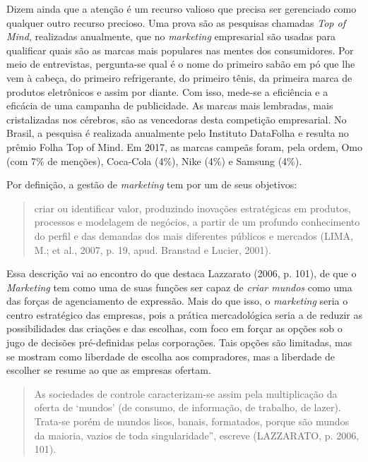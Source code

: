 Dizem ainda que a atenção é um recurso valioso que precisa ser
gerenciado como qualquer outro recurso precioso. Uma prova são as
pesquisas chamadas \emph{Top of Mind}, realizadas anualmente, que no
\emph{marketing} empresarial são usadas para qualificar quais são as
marcas mais populares nas mentes dos consumidores. Por meio de
entrevistas, pergunta-se qual é o nome do primeiro sabão em pó que lhe
vem à cabeça, do primeiro refrigerante, do primeiro tênis, da primeira
marca de produtos eletrônicos e assim por diante. Com isso, mede-se a
eficiência e a eficácia de uma campanha de publicidade. As marcas mais
lembradas, mais cristalizadas nos cérebros, são as vencedoras desta
competição empresarial. No Brasil, a pesquisa é realizada anualmente
pelo Instituto DataFolha e resulta no prêmio Folha Top of Mind. Em 2017,
as marcas campeãs foram, pela ordem, Omo (com 7\% de menções), Coca-Cola
(4\%), Nike (4\%) e Samsung (4\%).

Por definição, a gestão de \emph{marketing} tem por um de seus
objetivos:

\begin{quote}
criar ou identificar valor, produzindo inovações estratégicas em
produtos, processos e modelagem de negócios, a partir de um profundo
conhecimento do perfil e das demandas dos mais diferentes públicos e
mercados (LIMA, M.; et al., 2007, p. 19, apud. Branstad e Lucier, 2001).
\end{quote}

Essa descrição vai ao encontro do que destaca Lazzarato (2006, p. 101),
de que o \emph{Marketing} tem como uma de suas funções ser capaz de
\emph{criar mundos} como uma das forças de agenciamento de expressão.
Mais do que isso, o \emph{marketing} seria o centro estratégico das
empresas, pois a prática mercadológica seria a de reduzir as
possibilidades das criações e das escolhas, com foco em forçar as opções
sob o jugo de decisões pré-definidas pelas corporações. Tais opções são
limitadas, mas se mostram como liberdade de escolha aos compradores, mas
a liberdade de escolher se resume ao que as empresas ofertam.

\begin{quote}
As sociedades de controle caracterizam-se assim pela multiplicação da
oferta de `mundos' (de consumo, de informação, de trabalho, de lazer).
Trata-se porém de mundos lisos, banais, formatados, porque são mundos da
maioria, vazios de toda singularidade'', escreve (LAZZARATO, p. 2006,
101).
\end{quote}

